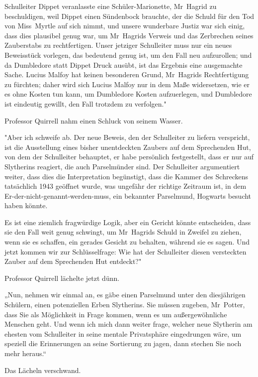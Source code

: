 {Schulleiter Dippet veranlasste eine Schüler-Marionette, Mr~Hagrid zu beschuldigen, weil Dippet einen Sündenbock brauchte, der die Schuld für den Tod von Miss~Myrtle auf sich nimmt, und unsere wunderbare Justiz war sich einig, dass dies plausibel genug war, um Mr~Hagrids Verweis und das Zerbrechen seines Zauberstabs zu rechtfertigen. Unser jetziger Schulleiter muss nur ein neues Beweisstück vorlegen, das bedeutend genug ist, um den Fall neu aufzurollen; und da Dumbledore statt Dippet Druck ausübt, ist das Ergebnis eine ausgemachte Sache. Lucius Malfoy hat keinen besonderen Grund, Mr~Hagrids Rechtfertigung zu fürchten; daher wird sich Lucius Malfoy nur in dem Maße widersetzen, wie er es ohne Kosten tun kann, um Dumbledore Kosten aufzuerlegen, und Dumbledore ist eindeutig gewillt, den Fall trotzdem zu verfolgen."

Professor Quirrell nahm einen Schluck von seinem Wasser.

"Aber ich schweife ab. Der neue Beweis, den der Schulleiter zu liefern verspricht, ist die Ausstellung eines bisher unentdeckten Zaubers auf dem Sprechenden Hut, von dem der Schulleiter behauptet, er habe persönlich festgestellt, dass er nur auf Slytherins reagiert, die auch Parselmünder sind. Der Schulleiter argumentiert weiter, dass dies die Interpretation begünstigt, dass die Kammer des Schreckens tatsächlich 1943 geöffnet wurde, was ungefähr der richtige Zeitraum ist, in dem Er-der-nicht-genannt-werden-muss, ein bekannter Parselmund, Hogwarts besucht haben könnte.

Es ist eine ziemlich fragwürdige Logik, aber ein Gericht könnte entscheiden, dass sie den Fall weit genug schwingt, um Mr~Hagrids Schuld in Zweifel zu ziehen, wenn sie es schaffen, ein gerades Gesicht zu behalten, während sie es sagen. Und jetzt kommen wir zur Schlüsselfrage: Wie hat der Schulleiter diesen versteckten Zauber auf dem Sprechenden Hut entdeckt?"

Professor Quirrell lächelte jetzt dünn.

„Nun, nehmen wir einmal an, es gäbe einen Parselmund unter den diesjährigen Schülern, einen potenziellen Erben Slytherins. Sie müssen zugeben, Mr~Potter, dass Sie als Möglichkeit in Frage kommen, wenn es um außergewöhnliche Menschen geht. Und wenn ich mich dann weiter frage, welcher neue Slytherin am ehesten vom Schulleiter in seine mentale Privatsphäre eingedrungen wäre, um speziell die Erinnerungen an seine Sortierung zu jagen, dann stechen Sie noch mehr heraus.“

Das Lächeln verschwand.

}
